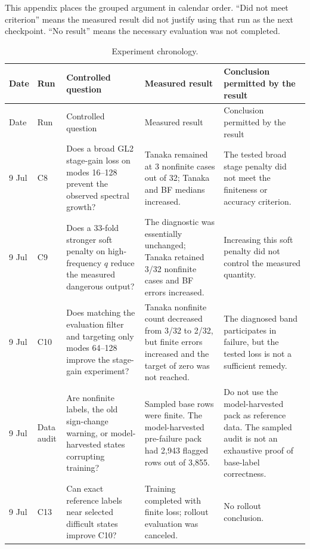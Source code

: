 \documentclass[11pt]{article}
\begin{document}
{This appendix places the grouped argument in calendar order.  ``Did not meet
criterion'' means the measured result did not justify using that run as the
next checkpoint.  ``No result'' means the necessary evaluation was not
completed.

\begingroup
\setlength{\tabcolsep}{3pt}
\begin{longtable}{p{}p{}p{}p{}p{}}
\caption{Experiment chronology.}
\label{tab:chronology}\\
\toprule
Date & Run & Controlled question & Measured result & Conclusion permitted by the result \\
\midrule
\endfirsthead
\toprule
Date & Run & Controlled question & Measured result & Conclusion permitted by the result \\
\midrule
\endhead

9 Jul & C8
& Does a broad GL2 stage-gain loss on modes 16--128 prevent the observed
spectral growth?
& Tanaka remained at 3 nonfinite cases out of 32; Tanaka and BF medians
increased.
& The tested broad stage penalty did not meet the finiteness or accuracy
criterion. \\

9 Jul & C9
& Does a 33-fold stronger soft penalty on high-frequency $q$ reduce the
measured dangerous output?
& The diagnostic was essentially unchanged; Tanaka retained 3/32 nonfinite
cases and BF errors increased.
& Increasing this soft penalty did not control the measured quantity. \\

9 Jul & C10
& Does matching the evaluation filter and targeting only modes 64--128 improve
the stage-gain experiment?
& Tanaka nonfinite count decreased from 3/32 to 2/32, but finite errors
increased and the target of zero was not reached.
& The diagnosed band participates in failure, but the tested loss is not a
sufficient remedy. \\

9 Jul & Data audit
& Are nonfinite labels, the old sign-change warning, or model-harvested states
corrupting training?
& Sampled base rows were finite.  The model-harvested pre-failure pack had
2,943 flagged rows out of 3,855.
& Do not use the model-harvested pack as reference data.  The sampled audit is
not an exhaustive proof of base-label correctness. \\

9 Jul & C13
& Can exact reference labels near selected difficult states improve C10?
& Training completed with finite loss; rollout evaluation was canceled.
& No rollout conclusion. \\


\end{longtable}}
\end{document}
